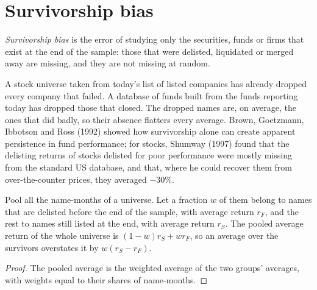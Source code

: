 \section{Survivorship bias}

\begin{definition}\label{def:rs:point-in-time-data-and-the-biases:survivorship}
\emph{Survivorship bias} is the error of studying only the securities, funds or firms that exist at
the end of the sample: those that were delisted, liquidated or merged away are missing, and they are not missing at random.
\end{definition}

A stock universe taken from today's list of listed companies has already dropped every company that failed. A database of
funds built from the funds reporting today has dropped those that closed. The dropped names are, on average, the ones that did
badly, so their absence flatters every average. Brown, Goetzmann, Ibbotson and Ross (1992) showed how survivorship alone can
create apparent persistence in fund performance; for stocks, Shumway (1997) found that the delisting returns of stocks delisted
for poor performance were mostly missing from the standard US database, and that, where he could recover them from
over-the-counter prices, they averaged $-30\%$.

\begin{proposition}\label{prop:rs:point-in-time-data-and-the-biases:survivors}
Pool all the name-months of a universe. Let a fraction $w$ of them belong to names that are delisted before the end of the
sample, with average return $r_F$, and the rest to names still listed at the end, with average return $r_S$. The pooled average
return of the whole universe is $(1 - w)r_S + wr_F$, so an average over the survivors overstates it by $w(r_S - r_F)$.
\end{proposition}

\begin{proof}
The pooled average is the weighted average of the two groups' averages, with weights equal to their shares of name-months.
\end{proof}


